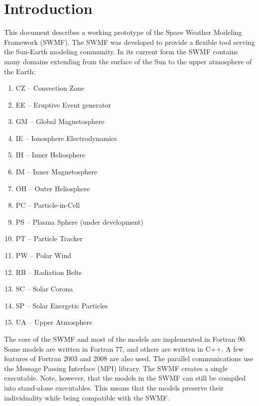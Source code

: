 


\chapter{Introduction}

This document describes a working prototype of the 
Space Weather Modeling Framework (SWMF).
The SWMF was developed to provide a flexible tool serving the Sun-Earth
modeling community.  In its current form the SWMF contains many 
domains extending from the surface of the Sun to the upper atmosphere of the 
Earth: 
\begin{enumerate}
\item CZ -- Convection Zone
\item EE -- Eruptive Event generator
\item GM -- Global Magnetosphere 
\item IE -- Ionosphere Electrodynamics
\item IH -- Inner Heliosphere
\item IM -- Inner Magnetosphere
\item OH -- Outer Heliosphere
\item PC -- Particle-in-Cell
\item PS -- Plasma Sphere (under development)
\item PT -- Particle Tracker
\item PW -- Polar Wind
\item RB -- Radiation Belts
\item SC -- Solar Corona
\item SP -- Solar Energetic Particles 
\item UA -- Upper Atmosphere
\end{enumerate}
The core of the SWMF and most of the models are implemented in Fortran 90.
Some models are written in Fortran 77, and others are written in C++.
A few features of Fortran 2003 and 2008 are also used.
The parallel communications use the Message Passing Interface (MPI) library. 
The SWMF creates a single executable. Note, however, that the
models in the SWMF can still be compiled into stand-alone executables.
This means that the models preserve their individuality while being
compatible with the SWMF.

